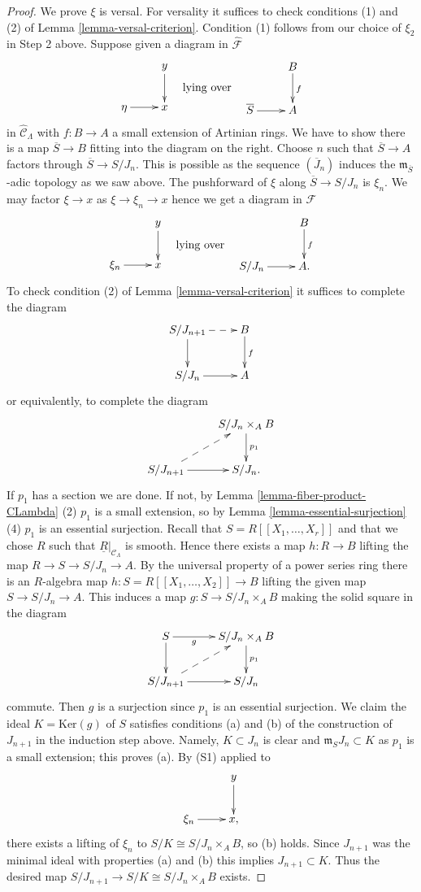 \begin{proof}
\medskip \noindent
We prove $\xi$ is versal. For versality it suffices to check 
conditions (1) and (2) of
Lemma \ref{lemma-versal-criterion}.
Condition (1) follows from our choice of $\xi_2$ in Step 2 above.
Suppose given a diagram in $\widehat{\mathcal{F}}$
$$
\vcenter{
\xymatrix{
            &  y \ar[d] \\
\eta \ar[r]  &  x
}
}
\quad\text{lying over}\quad
\vcenter{
\xymatrix{
         &   B  \ar[d]^{f} \\
\overline{S} \ar[r] &   A 
}
}
$$
in $\widehat{\mathcal{C}}_\Lambda$ with $f: B \to A$ a small extension 
of Artinian rings. We have to show there is a map $\overline{S} \to B$ fitting
into the diagram on the right. Choose $n$ such that
$\overline{S} \to A$ factors through $\overline{S} \to S/J_n$. This is
possible as the sequence $(\overline{J}_n)$ induces the
$\mathfrak m_{\overline{S}}$-adic topology as we saw above.
The pushforward of $\xi$ along $\overline{S} \to S/J_n$ is $\xi_n$.
We may factor $\xi \to x$ as $\xi \to \xi_n \to x$ hence we get a diagram
in $\mathcal{F}$
$$
\vcenter{
\xymatrix{
            &  y \ar[d] \\
\xi_n \ar[r]  &  x
}
}
\quad\text{lying over}\quad
\vcenter{
\xymatrix{
         &   B  \ar[d]^{f} \\
S/J_n \ar[r] &   A .
}
}
$$
To check condition (2) of
Lemma \ref{lemma-versal-criterion}
it suffices to complete the diagram
$$
\xymatrix{
S/J_{n + 1} \ar[d] \ar@{-->}[r] & B \ar[d]^{f} \\
S/J_n   \ar[r] & A 
}
$$
or equivalently, to complete the diagram
$$
\xymatrix{
  &  S/J_n \times_{A} B \ar[d]^{p_1} \\
S/J_{n + 1} \ar@{-->}[ur] \ar[r] &  S/J_n.
}
$$
If $p_1$ has a section we are done. If not, by
Lemma \ref{lemma-fiber-product-CLambda} (2)
$p_1$ is a small extension, so by
Lemma \ref{lemma-essential-surjection} (4)
$p_1$ is an essential surjection. Recall that $S = R[[X_1, \ldots, X_r]]$
and that we chose $R$ such that $\underline{R}|_{\mathcal{C}_\Lambda}$
is smooth. Hence there exists a map $h : R \to B$ lifting the map
$R \to S \to S/J_n \to A$. By the universal property of a power series
ring there is an $R$-algebra map $h : S = R[[X_1, \dots, X_2]] \to B$
lifting the given map $S \to S/J_n \to A$. This induces a map
$g: S \to S/J_n \times_{A} B$ making the solid square in the diagram
$$
\xymatrix{
S \ar[d] \ar[r]_-g  &  S/J_n \times_{A} B \ar[d]^{p_1} \\
S/J_{n + 1} \ar@{-->}[ur] \ar[r] &  S/J_n
}
$$
commute. Then $g$ is a surjection since $p_1$ is an essential surjection.
We claim the ideal $K = \text{Ker}(g)$ of $S$ satisfies conditions (a) and
(b) of the construction of $J_{n + 1}$ in the induction step above.
Namely, $K \subset J_n$ is clear and $\mathfrak m_SJ_n \subset K$ as $p_1$
is a small extension; this proves (a). By (S1) applied to
$$
\xymatrix{
            &  y \ar[d] \\
\xi_n \ar[r]  &  x,
}
$$
there exists a lifting of $\xi_n$ to $S/K \cong S/J_n \times_A B$, so (b) 
holds. Since $J_{n + 1}$ was the minimal ideal with properties (a) and (b)
this implies $J_{n + 1} \subset K$. Thus the desired map
$S/J_{n+1} \to S/K \cong S/J_n \times_{A} B$ exists.
\end{proof}
